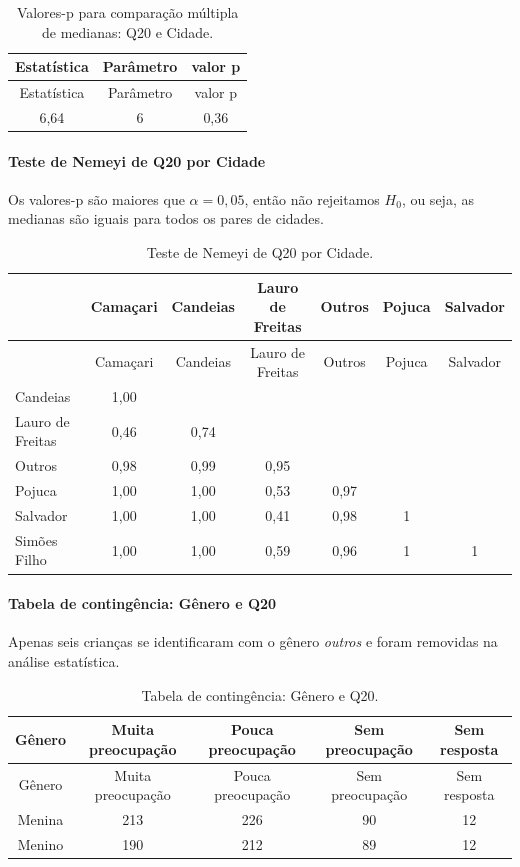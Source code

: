 \documentclass[]{article}
\let\oldparagraph\paragraph
\renewcommand{\paragraph}[1]{\oldparagraph{#1}\mbox{}}
\begin{document}
\begin{longtable}[]{@{}ccc@{}}
\caption{\label{tab:unnamed-chunk-293}Valores-p para comparação múltipla de medianas: Q20 e Cidade.}\tabularnewline
\toprule
Estatística & Parâmetro & valor p\tabularnewline
\midrule
\endfirsthead
\toprule
Estatística & Parâmetro & valor p\tabularnewline
\midrule
\endhead
6,64 & 6 & 0,36\tabularnewline
\bottomrule
\end{longtable}

\hypertarget{teste-de-nemeyi-de-q20-por-cidade}{%
\paragraph{Teste de Nemeyi de Q20 por Cidade}\label{teste-de-nemeyi-de-q20-por-cidade}}

Os valores-p são maiores que \(\alpha=0,05\), então não rejeitamos \(H_0\), ou seja, as medianas são iguais para todos os pares de cidades.

\begin{longtable}[]{@{}lcccccc@{}}
\caption{\label{tab:unnamed-chunk-294}Teste de Nemeyi de Q20 por Cidade.}\tabularnewline
\toprule
& Camaçari & Candeias & Lauro de Freitas & Outros & Pojuca & Salvador\tabularnewline
\midrule
\endfirsthead
\toprule
& Camaçari & Candeias & Lauro de Freitas & Outros & Pojuca & Salvador\tabularnewline
\midrule
\endhead
Candeias & 1,00 & & & & &\tabularnewline
Lauro de Freitas & 0,46 & 0,74 & & & &\tabularnewline
Outros & 0,98 & 0,99 & 0,95 & & &\tabularnewline
Pojuca & 1,00 & 1,00 & 0,53 & 0,97 & &\tabularnewline
Salvador & 1,00 & 1,00 & 0,41 & 0,98 & 1 &\tabularnewline
Simões Filho & 1,00 & 1,00 & 0,59 & 0,96 & 1 & 1\tabularnewline
\bottomrule
\end{longtable}

\cleardoublepage

\hypertarget{tabela-de-continguxeancia-guxeanero-e-q20}{%
\paragraph{Tabela de contingência: Gênero e Q20}\label{tabela-de-continguxeancia-guxeanero-e-q20}}

Apenas seis crianças se identificaram com o gênero \emph{outros} e foram removidas na análise estatística.

\begin{longtable}[]{@{}ccccc@{}}
\caption{\label{tab:unnamed-chunk-295}Tabela de contingência: Gênero e Q20.}\tabularnewline
\toprule
Gênero & Muita preocupação & Pouca preocupação & Sem preocupação & Sem resposta\tabularnewline
\midrule
\endfirsthead
\toprule
Gênero & Muita preocupação & Pouca preocupação & Sem preocupação & Sem resposta\tabularnewline
\midrule
\endhead
Menina & 213 & 226 & 90 & 12\tabularnewline
Menino & 190 & 212 & 89 & 12\tabularnewline
\bottomrule
\end{longtable}
\end{document}
